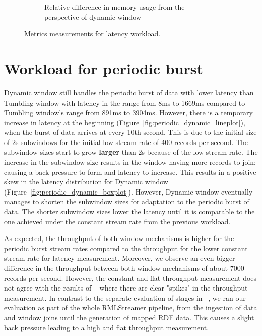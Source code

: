 \begin{figure}
\begin{subfigure}[b]{\textwidth}
        \caption{Relative difference in memory usage from the perspective of dynamic window}
        \label{fig:constant_mem_diff}
    \end{subfigure}

    \caption{Metrics measurements for latency workload.}%
    \label{fig:constant_measurement}
\end{figure}


\newpage
\section{Workload for periodic burst}%
\label{sec:Results Workload for periodic burst}

Dynamic window still handles the periodic burst of data with lower latency 
than Tumbling window with latency in the range from 8ms to 1669ms compared to 
Tumbling window's range from 891ms to 3904ms.
However, there is a temporary increase in latency at the beginning 
(Figure~\ref{fig:periodic_dynamic_lineplot}), 
when the burst of data arrives at every 10th second. 
This is due to the initial size of 2s subwindows for the initial low stream rate of 400 records per second. 
The subwindow sizes start to grow \textbf{larger} than 2s because of the low stream rate. 
The increase in the subwindow size results in the window 
having more records to join; causing a back pressure to form and latency to increase.  
This results in a positive skew in the latency distribution for Dynamic window (Figure~\ref{fig:periodic_dynamic_boxplot}). 
However, Dynamic window eventually manages to shorten the subwindow sizes for adaptation to the periodic burst of data.
The shorter subwindow sizes lower the latency until it is comparable to the one achieved under the constant stream rate from the 
previous workload.


As expected, the throughput of both window mechanisms is higher for the periodic burst stream rates compared to the throughput for the lower constant stream rate for latency measurement.
Moreover, we observe an even bigger difference in the throughput between both 
window mechanisms of about 7000 records per second. However, the
constant and flat throughput measurement does not agree 
with the results of ~\cite{evalution_of_spe} where there are clear "spikes" in the throughput measurement. In 
contrast to the separate evaluation of stages in ~\cite{evalution_of_spe}, 
we ran our evaluation as part of the whole RMLStreamer pipeline, from the 
ingestion of data and window joins until the generation of mapped RDF data. This causes a slight back pressure 
leading to a high and flat throughput measurement. 

